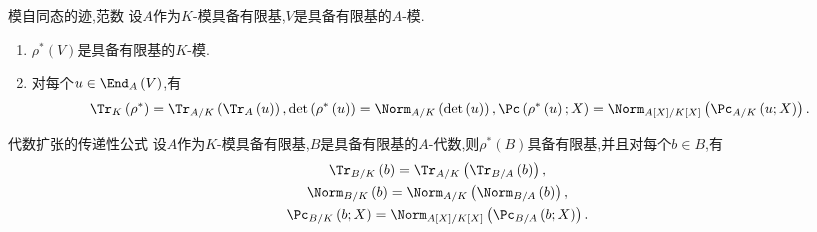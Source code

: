 \begin{proposition}{模自同态的迹,范数}{}
	设$A$作为$K$-模具备有限基,$V$是具备有限基的$A$-模.
	\begin{enumerate}
		\item $\rho^{\ast}\left(V\right)$是具备有限基的$K$-模.
		\item 对每个$u\in\End_{A}\left(V\right)$,有
		\begin{align*}
			\Tr_{K}\left(\rho^{\ast}\right)=\Tr_{A/K}\left(\Tr_{A}\left(u\right)\right),\det\left(\rho^{\ast}\left(u\right)\right)=\Norm_{A/K}\left(\det\left(u\right)\right),\Pc\left(\rho^{\ast}\left(u\right);X\right)=\Norm_{A\left[X\right]/K\left[X\right]}\left(\Pc_{A/K}\left(u;X\right)\right).
		\end{align*}
	\end{enumerate}
\end{proposition}

\begin{corollary}{代数扩张的传递性公式}{}
	设$A$作为$K$-模具备有限基,$B$是具备有限基的$A$-代数,则$\rho^{\ast}\left(B\right)$具备有限基,并且对每个$b\in B$,有
	\begin{gather*}
		\Tr_{B/K}\left(b\right)=\Tr_{A/K}\left(\Tr_{B/A}\left(b\right)\right),\\
		\Norm_{B/K}\left(b\right)=\Norm_{A/K}\left(\Norm_{B/A}\left(b\right)\right),\\
		\Pc_{B/K}\left(b;X\right)=\Norm_{A\left[X\right]/K\left[X\right]}\left(\Pc_{B/A}\left(b;X\right)\right).
	\end{gather*}
\end{corollary}

